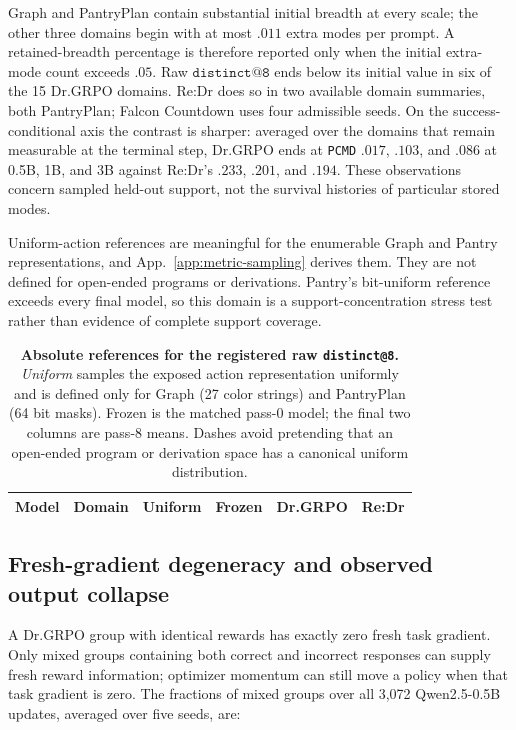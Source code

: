 \documentclass{article}
\makeatletter
\newcommand{\1}{\mathbf 1}
\newcommand{\pmd}{\texttt{PCMD}}
\newcommand{\distk}{\texttt{distinct@8}}
\theoremstyle{remark}
\theoremstyle{definition}
\theoremstyle{plain}
\makeatother
\begin{document}
Graph and PantryPlan contain substantial initial breadth at every scale;
the other three domains begin with at most $.011$ extra modes per prompt.
A retained-breadth percentage is therefore reported only when the initial
extra-mode count exceeds $.05$. Raw $\texttt{distinct@8}$ ends below its
initial value in six of the 15 Dr.GRPO domains. Re:Dr does so in
two available domain summaries, both PantryPlan; Falcon Countdown uses
four admissible seeds. On the success-conditional axis the contrast is
sharper: averaged over the domains that remain measurable at the terminal
step, Dr.GRPO ends at \pmd{} $.017$, $.103$, and $.086$ at 0.5B, 1B, and 3B
against Re:Dr's $.233$, $.201$, and $.194$. These observations concern
sampled held-out support, not the survival histories of particular stored
modes.

Uniform-action references are meaningful for the enumerable Graph and
Pantry representations, and App.~\ref{app:metric-sampling} derives them. They
are not defined for open-ended programs or derivations. Pantry's bit-uniform reference exceeds every final model, so
this domain is a support-concentration stress test rather than evidence
of complete support coverage.

\begin{table}[t]
  \centering
  \caption{\textbf{Absolute references for the registered raw \distk{}.}
  \emph{Uniform} samples the exposed action representation uniformly and is
  defined only for Graph (27 color strings) and PantryPlan (64 bit masks).
  Frozen is the matched pass-0 model; the final two columns are pass-8 means.
  Dashes avoid pretending that an open-ended program or derivation space has a
  canonical uniform distribution.}
  \label{tab:absolute-support-references}
  \scriptsize
  \setlength{\tabcolsep}{4.2pt}
  \begin{tabular}{@{}llrrrr@{}}
    \toprule
    \textbf{Model} & \textbf{Domain} & \textbf{Uniform} & \textbf{Frozen}
      & \textbf{Dr.GRPO} & \textbf{Re:Dr} \\
    \midrule
    
  \end{tabular}
\end{table}


\subsection{Fresh-gradient degeneracy and observed output collapse}
\label{app:degenerate-groups}

A Dr.GRPO group with identical rewards has exactly zero fresh task gradient.
Only mixed groups containing both correct and incorrect responses can
supply fresh reward information; optimizer momentum can still move a
policy when that task gradient is zero. The fractions of mixed groups
over all 3,072 Qwen2.5-0.5B updates, averaged over five seeds, are:
\end{document}
